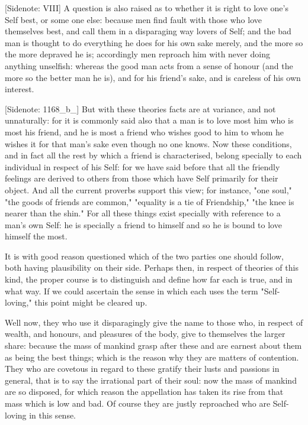 [Sidenote: VIII] A question is also raised as to whether it is right
to love one's Self best, or some one else: because men find fault with
those who love themselves best, and call them in a disparaging way
lovers of Self; and the bad man is thought to do everything he does
for his own sake merely, and the more so the more depraved he is;
accordingly men reproach him with never doing anything unselfish:
whereas the good man acts from a sense of honour (and the more so the
better man he is), and for his friend's sake, and is careless of his own
interest.

[Sidenote: 1168_b_] But with these theories facts are at variance, and
not unnaturally: for it is commonly said also that a man is to love most
him who is most his friend, and he is most a friend who wishes good to
him to whom he wishes it for that man's sake even though no one knows.
Now these conditions, and in fact all the rest by which a friend is
characterised, belong specially to each individual in respect of his
Self: for we have said before that all the friendly feelings are derived
to others from those which have Self primarily for their object. And all
the current proverbs support this view; for instance, "one soul," "the
goods of friends are common," "equality is a tie of Friendship," "the
knee is nearer than the shin." For all these things exist specially with
reference to a man's own Self: he is specially a friend to himself and
so he is bound to love himself the most.

It is with good reason questioned which of the two parties one should
follow, both having plausibility on their side. Perhaps then, in respect
of theories of this kind, the proper course is to distinguish and define
how far each is true, and in what way. If we could ascertain the sense
in which each uses the term "Self-loving," this point might be cleared
up.

Well now, they who use it disparagingly give the name to those who,
in respect of wealth, and honours, and pleasures of the body, give to
themselves the larger share: because the mass of mankind grasp after
these and are earnest about them as being the best things; which is the
reason why they are matters of contention. They who are covetous in
regard to these gratify their lusts and passions in general, that is to
say the irrational part of their soul: now the mass of mankind are so
disposed, for which reason the appellation has taken its rise from that
mass which is low and bad. Of course they are justly reproached who are
Self-loving in this sense.

